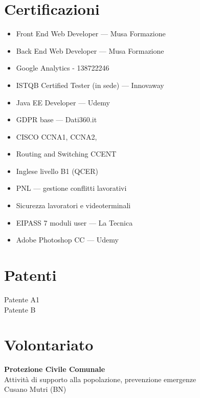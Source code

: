 \documentclass[a4paper,10pt]{article}
\begin{document}
\hrulefill

\section*{\faCertificate \quad Certificazioni}
\begin{multicols}{2}
\begin{itemize}[leftmargin=*]
  \item Front End Web Developer — Musa Formazione
  \item Back End Web Developer — Musa Formazione
  \item Google Analytics - 138722246
  \item ISTQB Certified Tester (in sede) — Innovaway
  \item Java EE Developer — Udemy
  \item GDPR base — Dati360.it
  \item CISCO CCNA1, CCNA2, 
  \item Routing and Switching CCENT
  \item Inglese livello B1 (QCER)
  \item PNL — gestione conflitti lavorativi
  \item Sicurezza lavoratori e videoterminali
  \item EIPASS 7 moduli user — La Tecnica
  \item Adobe Photoshop CC — Udemy
\end{itemize}
\end{multicols}

\noindent
\hrulefill
\vspace{0.5em} %

\begin{minipage}[t]{0.50\textwidth}
    \section*{\faCar \quad \textbf{Patenti}}
    Patente A1\\
    Patente B
\end{minipage}%
\hfill
\begin{minipage}[t]{0.50\textwidth}
    \section*{\faHandsHelping \quad \textbf{Volontariato}}
    \textbf {Protezione Civile Comunale \quad {[dal 15/09/2017]}}\\
    Attività di supporto alla popolazione, prevenzione emergenze\\
    Cusano Mutri (BN)
\end{minipage}
\end{document}
